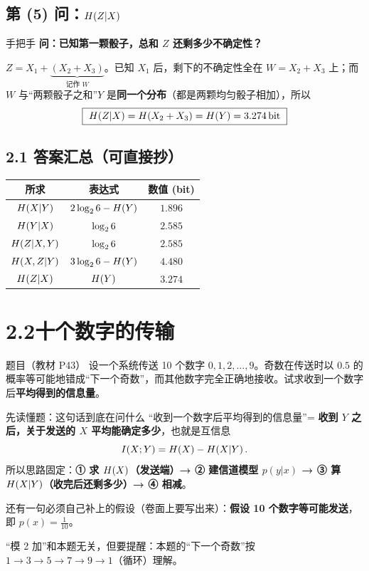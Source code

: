 \documentclass[11pt,a4paper]{ctexart}
\begin{document}
\subsection{第 (5) 问：$H\!\left(Z|X\right)$}

\begin{calc}{手把手}
\textbf{问：已知第一颗骰子，总和 $Z$ 还剩多少不确定性？}

$Z=X_1+\underbrace{(X_2+X_3)}_{\text{记作 }W}$。已知 $X_1$ 后，剩下的不确定性全在 $W=X_2+X_3$ 上；而 $W$ 与“两颗骰子之和”$Y$ 是\textbf{同一个分布}（都是两颗均匀骰子相加），所以
\[
\boxed{\ \Hx{Z|X}=\Hx{X_2+X_3}=\Hx{Y}=3.274\bit\ }
\]
\end{calc}

\subsection{2.1 答案汇总（可直接抄）}

\begin{center}
\renewcommand{\arraystretch}{1.35}
\begin{tabular}{c|c|c}
\toprule
所求 & 表达式 & 数值 (bit)\\
\midrule
$H\!\left(X|Y\right)$ & $2\log_{2}6-H\!\left(Y\right)$ & $1.896$\\
$H\!\left(Y|X\right)$ & $\log_{2}6$ & $2.585$\\
$H\!\left(Z|X,Y\right)$ & $\log_{2}6$ & $2.585$\\
$H\!\left(X,Z|Y\right)$ & $3\log_{2}6-H\!\left(Y\right)$ & $4.480$\\
$H\!\left(Z|X\right)$ & $H\!\left(Y\right)$ & $3.274$\\
\bottomrule
\end{tabular}
\end{center}

\section{2.2\quad 十个数字的传输}

\begin{defbox}{题目（教材 P43）}
设一个系统传送 10 个数字 $0,1,2,\dots,9$。奇数在传送时以 $0.5$ 的概率等可能地错成“下一个奇数”，而其他数字完全正确地接收。试求收到一个数字后\textbf{平均得到的信息量}。
\end{defbox}

\begin{idea}{先读懂题：这句话到底在问什么}
“收到一个数字后平均得到的信息量”= \textbf{收到 $Y$ 之后，关于发送的 $X$ 平均能确定多少}，也就是互信息
\[
I\!\left(X;Y\right)=H\!\left(X\right)-H\!\left(X|Y\right).
\]
所以思路固定：\textbf{① 求 $H\!\left(X\right)$（发送端）→ ② 建信道模型 $p(y|x)$ → ③ 算 $H\!\left(X|Y\right)$（收完后还剩多少）→ ④ 相减}。

还有一句必须自己补上的假设（卷面上要写出来）：\textbf{假设 10 个数字等可能发送}，即 $p(x)=\frac1{10}$。

“模 2 加”和本题无关，但要提醒：本题的“下一个奇数”按 $1\to3\to5\to7\to9\to1$（循环）理解。
\end{idea}
\end{document}
